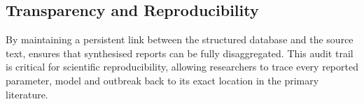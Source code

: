 \subsection{Transparency and Reproducibility}
By maintaining a persistent link between the structured database and the source text, \name{} ensures that synthesised reports can be fully disaggregated. This audit trail is critical for scientific reproducibility, allowing researchers to trace every reported parameter, model and outbreak back to its exact location in the primary literature.
